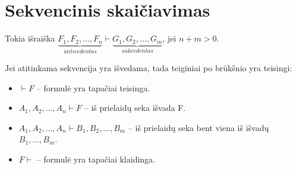 \chapter{Sekvencinis skaičiavimas}

\begin{defn}[Sekvencija]
  Tokia išraiška $\underbrace{F_{1},F_{2},\dots,F_{n}}_{anticedentas}%
  \vdash \underbrace{G_{1},G_{2},\dots,G_{m}}_{sukcedentas}$, jei 
  \mbox{$n + m > 0$}.
  \begin{note}
    Jei atitinkama sekvencija yra išvedama, tada teiginiai po brūkšnio
    yra teisingi:
    \begin{itemize}
      \item $\vdash F$ – formulė yra tapačiai teisinga.
      \item $A_{1},A_{2},\dots,A_{n} \vdash F$ – iš prielaidų seka išvada F.
      \item $A_{1},A_{2},\dots,A_{n} \vdash B_{1},B_{2},\dots,B_{m}$ – iš 
        prielaidų seka bent viena iš išvadų $B_{1},\dots,B_{m}$.
      \item $F \vdash$ – formulė yra tapačiai klaidinga.
    \end{itemize} 
  \end{note}
\end{defn}

